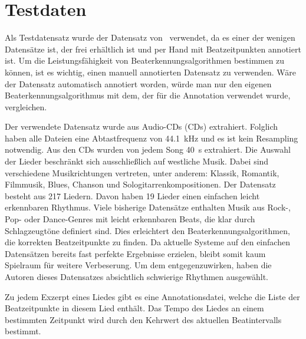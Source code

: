 \section{Testdaten} \label{konzept/testdaten}
{
	Als Testdatensatz wurde der Datensatz von~\cite{2012_HoDaZaOlGo} verwendet,
		da es einer der wenigen Datensätze ist,
		der frei erhältlich ist
		und per Hand mit Beatzeitpunkten annotiert ist.
	Um die Leistungsfähigkeit von Beaterkennungsalgorithmen bestimmen zu können,
		ist es wichtig,
		einen manuell annotierten Datensatz zu verwenden.
	Wäre der Datensatz automatisch annotiert worden,
		würde man nur den eigenen Beaterkennungsalgorithmus mit dem,
		der für die Annotation verwendet wurde,
		vergleichen.

	Der verwendete Datensatz wurde aus Audio-\acsp{CD} (\aclp{CD}) extrahiert.
	Folglich haben alle Dateien eine Abtastfrequenz von \SI{44.1}{\kilo\hertz}
		und es ist kein Resampling notwendig.
	Aus den \acp{CD} wurden von jedem Song \SI{40}{\second} extrahiert.
	Die Auswahl der Lieder beschränkt sich ausschlie{\ss}lich auf westliche Musik.
	Dabei sind verschiedene Musikrichtungen vertreten,
		unter anderem: Klassik, Romantik, Filmmusik, Blues, Chanson und Sologitarrenkompositionen.
	Der Datensatz besteht aus 217 Liedern.
	Davon haben 19 Lieder einen einfachen leicht erkennbaren Rhythmus.
	Viele bisherige Datensätze enthalten Musik aus Rock-, Pop- oder Dance-Genres
		mit leicht erkennbaren Beats,
		die klar durch Schlagzeugtöne definiert sind.
	Dies erleichtert den Beaterkennungsalgorithmen,
		die korrekten Beatzeitpunkte zu finden.
	Da aktuelle Systeme auf den einfachen Datensätzen bereits fast perfekte Ergebnisse erzielen,
		bleibt somit kaum Spielraum für weitere Verbeserung.
	Um dem entgegenzuwirken,
		haben die Autoren dieses Datensatzes absichtlich schwierige Rhythmen ausgewählt.

	Zu jedem Exzerpt eines Liedes gibt es eine Annotationsdatei,
		welche die Liste der Beatzeitpunkte in diesem Lied enthält.
	Das Tempo des Liedes an einem bestimmten Zeitpunkt wird durch den Kehrwert des aktuellen Beatintervalls bestimmt.
}

